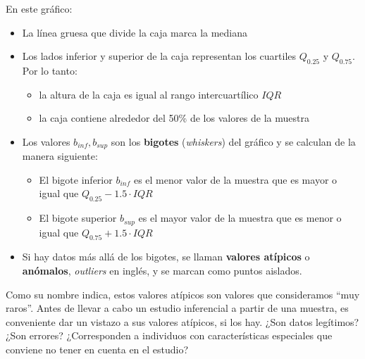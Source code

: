 \documentclass[
  spanish,
  letterpaper,
  DIV=11,
  numbers=noendperiod]{scrreprt}
\providecommand{\tightlist}{%
  \setlength{\itemsep}{0pt}\setlength{\parskip}{0pt}}
\begin{document}
En este gráfico:

\begin{itemize}
\item
  La línea gruesa que divide la caja marca la mediana
\item
  Los lados inferior y superior de la caja representan los cuartiles
  \(Q_{0.25}\) y \(Q_{0.75}\). Por lo tanto:

  \begin{itemize}
  \tightlist
  \item
    la altura de la caja es igual al rango intercuartílico
    \(\mathit{IQR}\)
  \item
    la caja contiene alrededor del 50\% de los valores de la muestra
  \end{itemize}
\item
  Los valores \(b_{inf}, b_{sup}\) son los \textbf{bigotes}
  (\emph{whiskers}) del gráfico y se calculan de la manera siguiente:

  \begin{itemize}
  \item
    El bigote inferior \(b_{inf}\) es el menor valor de la muestra que
    es mayor o igual que \(Q_{0.25}- 1.5\cdot \mathit{IQR}\)
  \item
    El bigote superior \(b_{sup}\) es el mayor valor de la muestra que
    es menor o igual que \(Q_{0.75}+1.5\cdot\mathit{IQR}\)
  \end{itemize}
\item
  Si hay datos más allá de los bigotes, se llaman \textbf{valores
  atípicos} o \textbf{anómalos}, \emph{outliers} en inglés, y se marcan
  como puntos aislados.
\end{itemize}

\begin{tcolorbox}[enhanced jigsaw, arc=.35mm, bottomrule=.15mm, bottomtitle=1mm, breakable, colback=white, colbacktitle=quarto-callout-note-color!10!white, colframe=quarto-callout-note-color-frame, coltitle=black, left=2mm, leftrule=.75mm, opacityback=0, opacitybacktitle=0.6, rightrule=.15mm, title=\textcolor{quarto-callout-note-color}{\faInfo}\hspace{0.5em}{Nota}, titlerule=0mm, toprule=.15mm, toptitle=1mm]

Como su nombre indica, estos valores atípicos son valores que
consideramos ``muy raros''. Antes de llevar a cabo un estudio
inferencial a partir de una muestra, es conveniente dar un vistazo a sus
valores atípicos, si los hay. ¿Son datos legítimos? ¿Son errores?
¿Corresponden a individuos con características especiales que conviene
no tener en cuenta en el estudio?

\end{tcolorbox}
\end{document}
